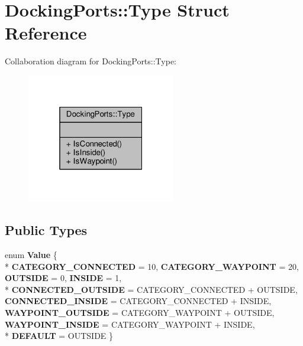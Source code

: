 \hypertarget{structDockingPorts_1_1Type}{}\section{Docking\+Ports\+:\+:Type Struct Reference}
\label{structDockingPorts_1_1Type}


Collaboration diagram for Docking\+Ports\+:\+:Type\+:
\nopagebreak
\begin{figure}[H]
\begin{center}
\leavevmode
\includegraphics[width=184pt]{d8/d77/structDockingPorts_1_1Type__coll__graph}
\end{center}
\end{figure}
\subsection*{Public Types}
\begin{DoxyCompactItemize}
\item 
enum {\bfseries Value} \{ \\*
{\bfseries C\+A\+T\+E\+G\+O\+R\+Y\+\_\+\+C\+O\+N\+N\+E\+C\+T\+ED} = 10, 
{\bfseries C\+A\+T\+E\+G\+O\+R\+Y\+\_\+\+W\+A\+Y\+P\+O\+I\+NT} = 20, 
{\bfseries O\+U\+T\+S\+I\+DE} = 0, 
{\bfseries I\+N\+S\+I\+DE} = 1, 
\\*
{\bfseries C\+O\+N\+N\+E\+C\+T\+E\+D\+\_\+\+O\+U\+T\+S\+I\+DE} = C\+A\+T\+E\+G\+O\+R\+Y\+\_\+\+C\+O\+N\+N\+E\+C\+T\+ED + O\+U\+T\+S\+I\+DE, 
{\bfseries C\+O\+N\+N\+E\+C\+T\+E\+D\+\_\+\+I\+N\+S\+I\+DE} = C\+A\+T\+E\+G\+O\+R\+Y\+\_\+\+C\+O\+N\+N\+E\+C\+T\+ED + I\+N\+S\+I\+DE, 
{\bfseries W\+A\+Y\+P\+O\+I\+N\+T\+\_\+\+O\+U\+T\+S\+I\+DE} = C\+A\+T\+E\+G\+O\+R\+Y\+\_\+\+W\+A\+Y\+P\+O\+I\+NT + O\+U\+T\+S\+I\+DE, 
{\bfseries W\+A\+Y\+P\+O\+I\+N\+T\+\_\+\+I\+N\+S\+I\+DE} = C\+A\+T\+E\+G\+O\+R\+Y\+\_\+\+W\+A\+Y\+P\+O\+I\+NT + I\+N\+S\+I\+DE, 
\\*
{\bfseries D\+E\+F\+A\+U\+LT} = O\+U\+T\+S\+I\+DE
 \}\hypertarget{structDockingPorts_1_1Type_a0a3e8dbe23ab6cc3295413acfe4e5d35}{}\label{structDockingPorts_1_1Type_a0a3e8dbe23ab6cc3295413acfe4e5d35}

\end{DoxyCompactItemize}
